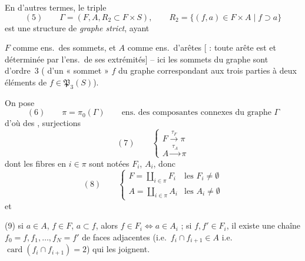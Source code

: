 \documentclass[11pt,a4paper]{article}
\begin{document}
En d'autres termes, le triple
\[
(5) \qquad \Gamma = (F, A, R_2 \subset F \times S), \qquad R_2 = \{ (f, a) \in F \times A \mid f \supset a \}
\]
est une structure de \emph{graphe strict}, ayant \ill{}

$F$ comme ens.\ des sommets, et $A$ comme ens.\ d'arêtes [\struck{\ill{}}  : toute arête est   et déterminée par l'ens.\ de ses extrémités] -- ici les sommets du graphe sont d'ordre~3 (\struck{\ill{}}  d'un « sommet » $f$ du graphe correspondant aux trois parties à deux éléments de $f \in \mathfrak{P}_3(S)$).

On pose
\[
(6) \qquad \pi = \pi_0(\Gamma) \qquad \text{ens.\ des composantes connexes du graphe } \Gamma
\]
 d'où des , surjections
\[
(7) \qquad
\left\{
\begin{array}{l}
F \xrightarrow{\ \tau_F\ } \pi \\[2pt]
A \xrightarrow{\ \tau_A\ } \pi
\end{array}
\right.
\]
dont les fibres en $i \in \pi$ sont notées $F_i$, $A_i$, donc
\[
(8) \qquad
\left\{
\begin{array}{ll}
F = \coprod_{i \in \pi} F_i & \text{les } F_i \neq \emptyset \\[2pt]
A = \coprod_{i \in \pi} A_i & \text{les } A_i \neq \emptyset
\end{array}
\right.
\]
et

(9) si $a \in A$, $f \in F$, $a \subset f$, alors $f \in F_i \iff a \in A_i$ ; si $f, f' \in F_i$, il existe une chaîne $f_0 = f, f_1, \ldots, f_N = f'$ de faces \struck{\ill{}}  adjacentes (i.e.\ $f_i \cap f_{i+1} \in A$ i.e.\ $\operatorname{card}(f_i \cap f_{i+1}) = 2$) qui les joignent.
\end{document}
